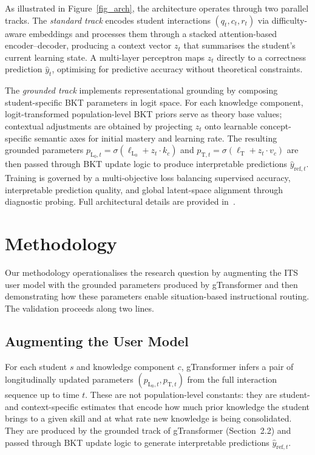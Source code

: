 \documentclass[runningheads]{llncs}
\begin{document}
As illustrated in Figure~\ref{fig_arch}, the architecture operates through two parallel tracks. The \textit{standard track} encodes student interactions $(q_t, c_t, r_t)$ via difficulty-aware embeddings and processes them through a stacked attention-based encoder--decoder, producing a context vector $z_t$ that summarises the student's current learning state. A multi-layer perceptron maps $z_t$ directly to a correctness prediction $\hat{y}_t$, optimising for predictive accuracy without theoretical constraints.

The \textit{grounded track} implements representational grounding by composing student-specific BKT parameters in logit space. For each knowledge component, logit-transformed population-level BKT priors serve as theory base values; contextual adjustments are obtained by projecting $z_t$ onto learnable concept-specific semantic axes for initial mastery and learning rate. The resulting grounded parameters $p_{\text{L}_0,t} = \sigma(\ell_{\text{L}_0} + z_t \cdot k_c)$ and $p_{\text{T},t} = \sigma(\ell_{\text{T}} + z_t \cdot v_c)$ are then passed through BKT update logic to produce interpretable predictions $\hat{y}_{\text{ref},t}$. Training is governed by a multi-objective loss balancing supervised accuracy, interpretable prediction quality, and global latent-space alignment through diagnostic probing. Full architectural details are provided in~\cite{labra2026theory}.



%
\section{Methodology}

Our methodology operationalises the research question by augmenting the ITS user model with the grounded parameters produced by gTransformer and then demonstrating how these parameters enable situation-based instructional routing. The validation proceeds along two lines.

\subsection{Augmenting the User Model}

For each student $s$ and knowledge component $c$, gTransformer infers a pair of longitudinally updated parameters $(p_{\text{L}_0,t}, p_{\text{T},t})$ from the full interaction sequence up to time $t$. These are not population-level constants: they are student- and context-specific estimates that encode how much prior knowledge the student brings to a given skill and at what rate new knowledge is being consolidated. They are produced by the grounded track of gTransformer (Section~2.2) and passed through BKT update logic to generate interpretable predictions $\hat{y}_{\text{ref},t}$.
\end{document}
